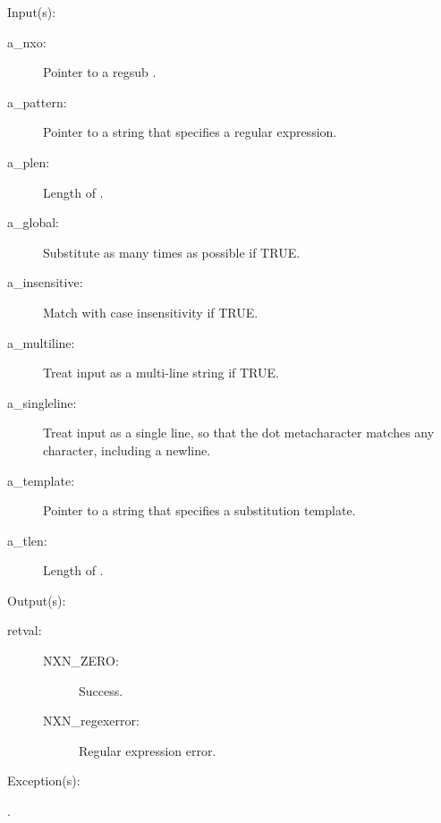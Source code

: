 \begin{capi}
\label{nxo_regsub_new}
	\begin{capilist}
	\item[Input(s): ]
		\begin{description}\item[]
		\item[a\_nxo: ]
			Pointer to a regsub .
		\item[a\_pattern: ]
			Pointer to a string that specifies a regular expression.
		\item[a\_plen: ]
			Length of .
		\item[a\_global: ]
			Substitute as many times as possible if TRUE.
		\item[a\_insensitive: ]
			Match with case insensitivity if TRUE.
		\item[a\_multiline: ]
			Treat input as a multi-line string if TRUE.
		\item[a\_singleline: ]
			Treat input as a single line, so that the dot
			metacharacter matches any character, including a
			newline.
		\item[a\_template: ]
			Pointer to a string that specifies a substitution
			template.
		\item[a\_tlen: ]
			Length of .
		\end{description}
	\item[Output(s): ]
		\begin{description}\item[]
		\item[retval: ]
			\begin{description}\item[]
			\item[NXN\_ZERO: ] Success.
			\item[NXN\_regexerror: ] Regular expression error.
			\end{description}
		\end{description}
	\item[Exception(s): ]
		\begin{description}\item[]
		\item[.]

\end{description}
\end{capilist}
\end{capi}
